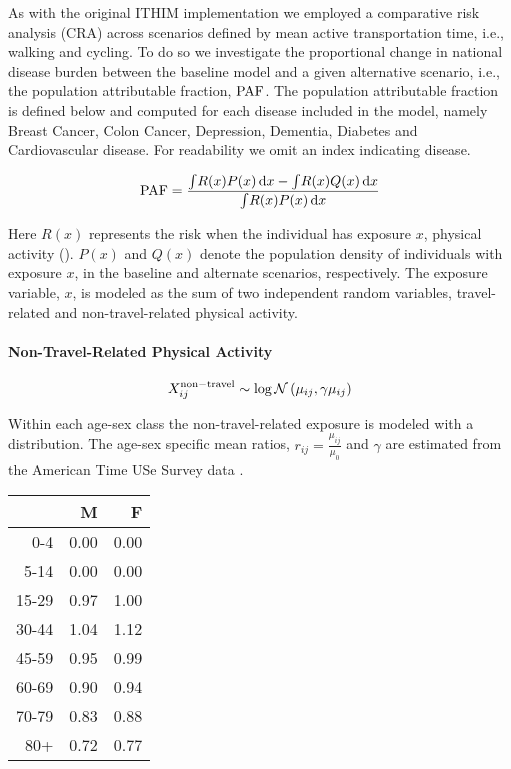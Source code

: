 As with the original ITHIM implementation we employed a comparative
risk analysis (CRA) across scenarios defined by mean active
transportation time, i.e., walking and cycling.  To do so we
investigate the proportional change in national disease burden between
the baseline model and a given alternative scenario, i.e., the
population attributable fraction, $\mathrm{PAF}$.  The population attributable
fraction is defined below and computed for each disease included in
the model, namely Breast Cancer, Colon Cancer, Depression, Dementia,
Diabetes and Cardiovascular disease.  For readability we omit an index
indicating disease.

\begin{equation}
\mathrm{PAF} = \frac{\int \! R(x)P(x) \, \mathrm{d}x  - \int \! R(x)Q(x) \,
  \mathrm{d}x}{\int \! R(x)P(x) \, \mathrm{d}x} \label{paf}
\end{equation}

Here $R(x)$ represents the risk when the individual has exposure $x$,
physical activity (\mets).  $P(x)$ and $Q(x)$ denote the population
density of individuals with exposure $x$, in the baseline and
alternate scenarios, respectively.  The exposure variable, $x$, is
modeled as the sum of two independent random variables, travel-related
and non-travel-related physical activity.

\paragraph{Non-Travel-Related Physical Activity}

\begin{equation}
X_{ij}^{\mathrm{non-travel}} \sim \log\mathcal{N}\left(\mu_{ij}, \gamma \mu_{ij}\right)
\end{equation}

Within each age-sex class the non-travel-related exposure is modeled
with a \logNormal{} distribution.  The age-sex specific mean ratios,
$r_{ij} = \frac{\mu_{ij}}{\mu_0}$ and $\gamma$ are estimated from the
American Time USe Survey data \cite{ATUS}.

\begin{table}[ht]
\centering
\begin{tabular}{rrr}
  \hline
 & M & F \\
  \hline
0-4 & 0.00 & 0.00 \\
  5-14 & 0.00 & 0.00 \\
  15-29 & 0.97 & 1.00 \\
  30-44 & 1.04 & 1.12 \\
  45-59 & 0.95 & 0.99 \\
  60-69 & 0.90 & 0.94 \\
  70-79 & 0.83 & 0.88 \\
  80+ & 0.72 & 0.77 \\
   \hline
\end{tabular}
\end{table}

